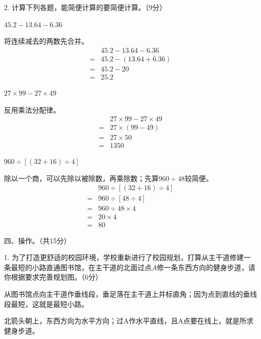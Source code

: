 2. 计算下列各题，能简便计算的要简便计算。（9分）\par \(45.2-13.64-6.36\)\par
\begin{BookAnswer}
将连续减去的两数先合并。\[\begin{aligned} &45.2-13.64-6.36\\ ={}&45.2-(13.64+6.36)\\ ={}&45.2-20\\ ={}&25.2\end{aligned}\]
\end{BookAnswer}

\(27\times99-27\times49\)\par
\begin{BookAnswer}
反用乘法分配律。\[\begin{aligned} &27\times99-27\times49\\ ={}&27\times(99-49)\\ ={}&27\times50\\ ={}&1350\end{aligned}\]
\end{BookAnswer}

\(960\div[(32+16)\div4]\)\par
\begin{BookAnswer}
除以一个商，可以先除以被除数，再乘除数；先算\(960\div48\)较简便。\[\begin{aligned}&960\div[(32+16)\div4]\\={}&960\div[48\div4]\\={}&960\div48\times4\\={}&20\times4\\={}&80\end{aligned}\]
\end{BookAnswer}

四、操作。（共15分）\par 1. 为了打造更舒适的校园环境，学校重新进行了校园规划，打算从主干道修建一条最短的小路直通图书馆，在主干道的北面过点\(A\)修一条东西方向的健身步道，请你根据要求完善规划图。（6分）\par
{}
\begin{BookAnswer}
从图书馆点向主干道作垂线段，垂足落在主干道上并标直角；因为点到直线的垂线段最短，这就是最短小路。\par 北箭头朝上，东西方向为水平方向；过A作水平直线，且A点要在线上，就是所求健身步道。
\end{BookAnswer}

